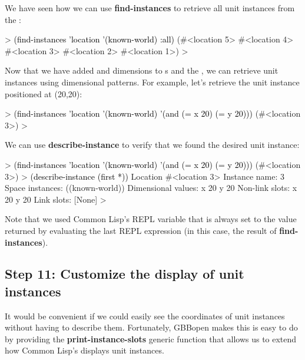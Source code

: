 \documentclass[10pt,twoside,english,pdftex]{article}
\begin{document}
%
We have seen how we can use \textbf{find-instances} to retrieve all
 unit instances from the :
%
\begin{example}\color{darkergray}%
  > \textcolor{black}{(find-instances 'location '(known-world) :all)}
  (#<location 5> #<location 4> #<location 3> #<location 2> #<location 1>)
  >
\end{example}

%
Now that we have added  and  dimensions to s
and the , we can retrieve  unit instances
using dimensional patterns.  For example, let's retrieve the unit instance
positioned at (20,20):
%
\begin{example}\color{darkergray}%
  > \textcolor{black}{(find-instances 'location '(known-world)
      '(and (= x 20) (= y 20)))}
   (#<location 3>)
  >
\end{example}

%
We can use \textbf{describe-instance} to verify that we found the desired
 unit instance:
%
\begin{example}\color{darkergray}%
  > \textcolor{black}{(find-instances 'location '(known-world)
      '(and (= x 20) (= y 20)))}
   (#<location 3>)
  > \textcolor{black}{(describe-instance (first *))}
  Location #<location 3>
    Instance name: 3
    Space instances: ((known-world))
    Dimensional values:
      x 20
      y 20
    Non-link slots:
      x 20
      y 20
    Link slots:
      [None]
  >
\end{example}
%
Note that we used Common Lisp's REPL \code{*} variable that is always set to
the value returned by evaluating the last REPL expression (in this case, the
result of \textbf{find-instances}).

\subsection*{Step 11: Customize the display of  unit instances}

It would be convenient if we could easily see the coordinates of
 unit instances without having to describe them.  Fortunately,
GBBopen makes this is easy to do by providing the
\textbf{print-instance-slots} generic function that allows us to extend how
Common Lisp's  displays  unit instances.
\end{document}
